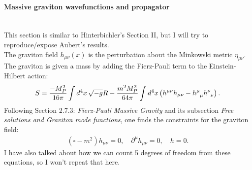 \documentclass{book}
\theoremstyle{definition}
\newcommand{\p}{\partial}
\newcommand{\f}[2]{\frac{#1}{#2}}
\newcommand{\lp}{\left(}
\newcommand{\rp}{\right)}
\begin{document}
\begin{framed}
	\paragraph{Massive graviton wavefunctions and propagator}$\,$\\
	
	This section is similar to Hinterbichler's Section II, but I will try to reproduce/expose Aubert's results. \\
	
	The graviton field $h_{\mu\nu}(x)$ is the perturbation about the Minkowski metric $\eta_{\mu\nu}$.  The graviton is given a mass by adding the Fierz-Pauli term to the Einstein-Hilbert action:
	\begin{align}
	S = \f{-M_P^2}{16\pi}\int d^4x\, \sqrt{-g}R - \f{m^2 M_P^2}{64\pi}\int d^4x \lp h^{\mu\nu}h_{\mu\nu} - \tensor{h}{^\mu_\mu}\tensor{h}{^\nu_\nu} \rp.
	\end{align}
	Following Section 2.7.3: \textit{Fierz-Pauli Massive Gravity} and its subsection \textit{Free solutions and Graviton mode functions}, one finds the constraints for the graviton field:
	\begin{align}
	(\square - m^2)h_{\mu\nu} = 0, \quad \p^\mu h_{\mu\nu} = 0, \quad h=0.
	\end{align}
	I have also talked about how we can count 5 degrees of freedom from these equations, so I won't repeat that here. \\
	

\end{framed}
\end{document}
